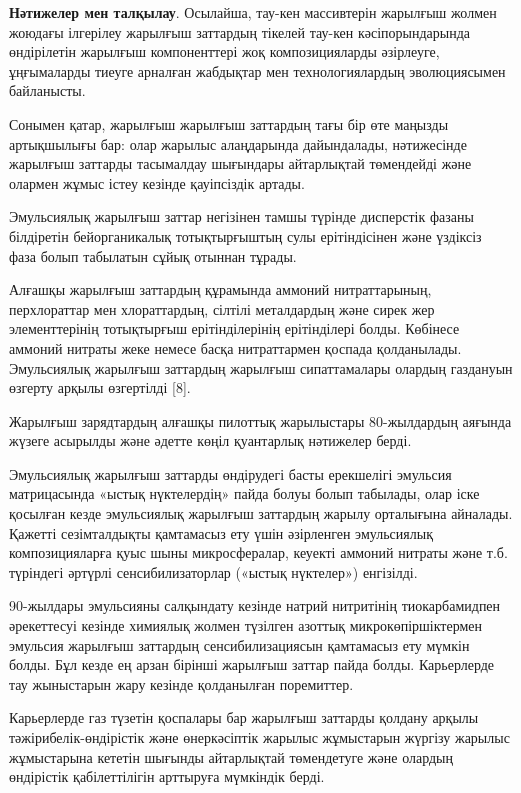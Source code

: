 \begin{multicols}{2}
{\bfseries Нәтижелер мен талқылау}. Осылайша, тау-кен массивтерін жарылғыш
жолмен жоюдағы ілгерілеу жарылғыш заттардың тікелей тау-кен
кәсіпорындарында өндірілетін жарылғыш компоненттері жоқ композицияларды
әзірлеуге, ұңғымаларды тиеуге арналған жабдықтар мен технологиялардың
эволюциясымен байланысты.

Сонымен қатар, жарылғыш жарылғыш заттардың тағы бір өте маңызды
артықшылығы бар: олар жарылыс алаңдарында дайындалады, нәтижесінде
жарылғыш заттарды тасымалдау шығындары айтарлықтай төмендейді және
олармен жұмыс істеу кезінде қауіпсіздік артады.

Эмульсиялық жарылғыш заттар негізінен тамшы түрінде дисперстік фазаны
білдіретін бейорганикалық тотықтырғыштың сулы ерітіндісінен және
үздіксіз фаза болып табылатын сұйық отыннан тұрады.

Алғашқы жарылғыш заттардың құрамында аммоний нитраттарының, перхлораттар
мен хлораттардың, сілтілі металдардың және сирек жер элементтерінің
тотықтырғыш ерітінділерінің ерітінділері болды. Көбінесе аммоний нитраты
жеке немесе басқа нитраттармен қоспада қолданылады. Эмульсиялық жарылғыш
заттардың жарылғыш сипаттамалары олардың газдануын өзгерту арқылы
өзгертілді {[}8{]}.

Жарылғыш зарядтардың алғашқы пилоттық жарылыстары 80-жылдардың аяғында
жүзеге асырылды және әдетте көңіл қуантарлық нәтижелер берді.

Эмульсиялық жарылғыш заттарды өндірудегі басты ерекшелігі эмульсия
матрицасында «ыстық нүктелердің» пайда болуы болып табылады, олар іске
қосылған кезде эмульсиялық жарылғыш заттардың жарылу орталығына
айналады. Қажетті сезімталдықты қамтамасыз ету үшін әзірленген
эмульсиялық композицияларға қуыс шыны микросфералар, кеуекті аммоний
нитраты және т.б. түріндегі әртүрлі сенсибилизаторлар («ыстық нүктелер»)
енгізілді.

90-жылдары эмульсияны салқындату кезінде натрий нитритінің
тиокарбамидпен әрекеттесуі кезінде химиялық жолмен түзілген азоттық
микрокөпіршіктермен эмульсия жарылғыш заттардың сенсибилизациясын
қамтамасыз ету мүмкін болды. Бұл кезде ең арзан бірінші жарылғыш заттар
пайда болды. Карьерлерде тау жыныстарын жару кезінде қолданылған
поремиттер.

Карьерлерде газ түзетін қоспалары бар жарылғыш заттарды қолдану арқылы
тәжірибелік-өндірістік және өнеркәсіптік жарылыс жұмыстарын жүргізу
жарылыс жұмыстарына кететін шығынды айтарлықтай төмендетуге және олардың
өндірістік қабілеттілігін арттыруға мүмкіндік берді.


\end{multicols}
